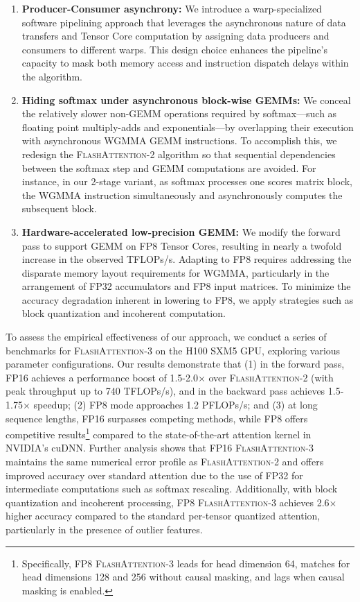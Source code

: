 \begin{enumerate}

\item \textbf{Producer-Consumer asynchrony:} We introduce a warp-specialized software pipelining approach that leverages the asynchronous nature of data transfers and Tensor Core computation by assigning data producers and consumers to different warps. This design choice enhances the pipeline’s capacity to mask both memory access and instruction dispatch delays within the algorithm.
\item \textbf{Hiding softmax under asynchronous block-wise GEMMs:} We conceal the relatively slower non-GEMM operations required by softmax—such as floating point multiply-adds and exponentials—by overlapping their execution with asynchronous WGMMA GEMM instructions. To accomplish this, we redesign the \textsc{FlashAttention-2} algorithm so that sequential dependencies between the softmax step and GEMM computations are avoided. For instance, in our 2-stage variant, as softmax processes one scores matrix block, the WGMMA instruction simultaneously and asynchronously computes the subsequent block.
\item \textbf{Hardware-accelerated low-precision GEMM:} We modify the forward pass to support GEMM on FP8 Tensor Cores, resulting in nearly a twofold increase in the observed TFLOPs/s. Adapting to FP8 requires addressing the disparate memory layout requirements for WGMMA, particularly in the arrangement of FP32 accumulators and FP8 input matrices. To minimize the accuracy degradation inherent in lowering to FP8, we apply strategies such as block quantization and incoherent computation.
\end{enumerate}

To assess the empirical effectiveness of our approach, we conduct a series of benchmarks for \textsc{FlashAttention-3} on the H100 SXM5 GPU, exploring various parameter configurations. Our results demonstrate that (1) in the forward pass, FP16 achieves a performance boost of 1.5-2.0$\times$ over \textsc{FlashAttention-2} (with peak throughput up to 740 TFLOPs/s), and in the backward pass achieves 1.5-1.75$\times$ speedup; (2) FP8 mode approaches 1.2 PFLOPs/s; and (3) at long sequence lengths, FP16 surpasses competing methods, while FP8 offers competitive results\footnote{Specifically, FP8 \textsc{FlashAttention-3} leads for head dimension 64, matches for head dimensions 128 and 256 without causal masking, and lags when causal masking is enabled.} compared to the state-of-the-art attention kernel in NVIDIA's cuDNN. Further analysis shows that FP16 \textsc{FlashAttention-3} maintains the same numerical error profile as \textsc{FlashAttention-2} and offers improved accuracy over standard attention due to the use of FP32 for intermediate computations such as softmax rescaling. Additionally, with block quantization and incoherent processing, FP8 \textsc{FlashAttention-3} achieves 2.6$\times$ higher accuracy compared to the standard per-tensor quantized attention, particularly in the presence of outlier features.

